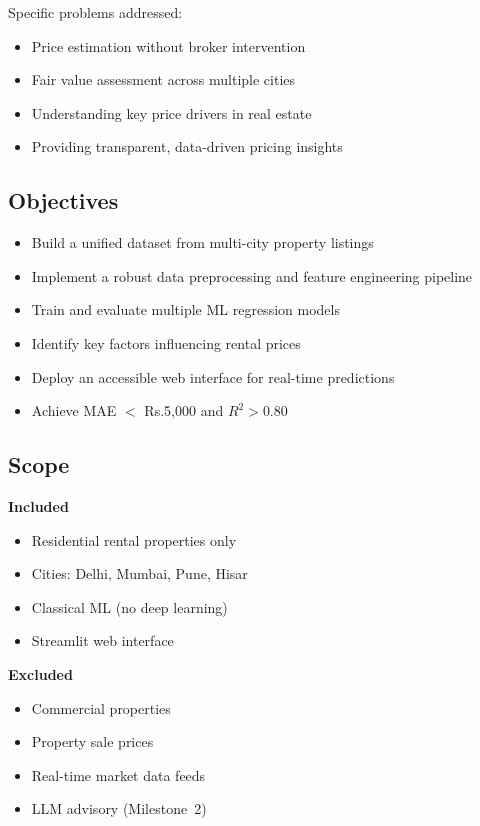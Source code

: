 \documentclass[12pt,a4paper]{article}
\makeatletter
\newcommand{\Rs}{Rs.\@}          %
\makeatother
\begin{document}
Specific problems addressed:
\begin{itemize}
  \item Price estimation without broker intervention
  \item Fair value assessment across multiple cities
  \item Understanding key price drivers in real estate
  \item Providing transparent, data-driven pricing insights
\end{itemize}

\subsection{Objectives}
\begin{itemize}
  \item Build a unified dataset from multi-city property listings
  \item Implement a robust data preprocessing and feature engineering pipeline
  \item Train and evaluate multiple ML regression models
  \item Identify key factors influencing rental prices
  \item Deploy an accessible web interface for real-time predictions
  \item Achieve MAE $<$ \Rs5{,}000 and $R^{2} > 0.80$
\end{itemize}

\subsection{Scope}
\begin{minipage}[t]{0.46\textwidth}
  \textbf{\color{Steel}Included}
  \begin{itemize}
    \item Residential rental properties only
    \item Cities: Delhi, Mumbai, Pune, Hisar
    \item Classical ML (no deep learning)
    \item Streamlit web interface
  \end{itemize}
\end{minipage}\hfill
\begin{minipage}[t]{0.46\textwidth}
  \textbf{\color{Steel}Excluded}
  \begin{itemize}
    \item Commercial properties
    \item Property sale prices
    \item Real-time market data feeds
    \item LLM advisory (Milestone~2)
  \end{itemize}
\end{minipage}
\end{document}
